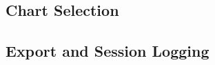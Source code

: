 \documentclass[conference]{IEEEtran}
\begin{document}




\subsection{Chart Selection}
\label{sec:impl:charting}


\subsection{Export and Session Logging}
\label{sec:impl:export}
\end{document}
